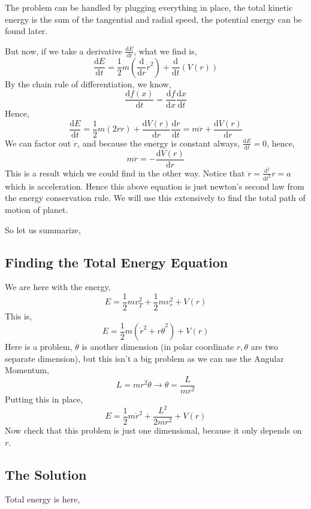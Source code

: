 \documentclass[12pt,a4paper]{article}
\begin{document}
The problem can be handled by plugging everything in place, the total kinetic energy is the sum of the tangential and radial speed, the potential energy can be found later. 

But now, if we take a derivative $ \frac{\mathrm{d} E}{\mathrm{d} t}$, what we find is,
\[ 
\frac{\mathrm{d} E}{\mathrm{d} t} =
\frac{1}{2}m \left( \frac{\mathrm{d} }{\mathrm{d} r} \dot{r}^2 \right) 
+ 
\frac{\mathrm{d} }{\mathrm{d} t} \left( V(r) \right) 
\]
By the chain rule of differentiation, we know,
\[ 
    \frac{\mathrm{d} f(x)}{\mathrm{d} t} = \frac{\mathrm{d} f}{\mathrm{d} x} \frac{\mathrm{d} x}{\mathrm{d} t}
\]
Hence,
\[ 
\frac{\mathrm{d} E}{\mathrm{d} t}=
\frac{1}{2} m 
\left( 2 \dot{ r} \ddot{ r } \right) + 
\frac{\mathrm{d} V(r)}{\mathrm{d} r} \frac{\mathrm{d} r}{\mathrm{d} t}
=
m \ddot{ r } + \frac{\mathrm{d} V(r)}{\mathrm{d} r}
\]
We can factor out $ \dot{r}$, and because the energy is constant always, $ \frac{\mathrm{d} E}{\mathrm{d} t} = 0$, hence,
\[ 
    m \ddot{ r } = - \frac{\mathrm{d} V(r)}{\mathrm{d} r}
\]
This is a result which we could find in the other way. Notice that $\ddot{ r }= \frac{\mathrm{d} ^2}{\mathrm{d} t^2}r= a$ which is acceleration. Hence this above equation is just newton's second law from the energy conservation rule. We will use this extensively to find the total path of motion of planet.

So let us summarize, 
\subsection{ Finding the Total Energy Equation }
We are here with the energy,
\[ 
    E = \frac{1}{2} m v_T ^2 + \frac{1}{2} m v_r ^2 + V(r)
\]
This is, 
\[ 
    E = \frac{1}{2} m \left( \dot{r}^2 + r \dot{\theta}^2 \right) + V(r)
\]
Here is a problem, $ \dot{\theta}$ is another dimension (in polar coordinate $r,\theta$ are two separate dimension), but this isn't a big problem as we can use the Angular Momentum,
\[ 
L = mr^2 \dot{\theta} \to \theta = \frac{L}{mr^2}
\]
Putting this in place,
\[ 
    E = \frac{1}{2} m \dot{r}^2 + \frac{L^2}{2mr^2} + V(r)
\]
Now check that this problem is just one dimensional, because it only depends on $r$.

\subsection{ The Solution }
Total energy is here,
\end{document}
